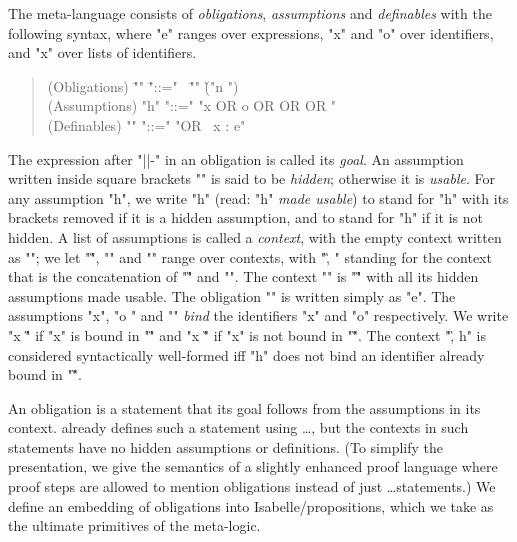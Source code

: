 \documentclass[a4paper]{easychair}
\begin{document}
\begin{defn} \label{defn:syntax}
The \tlatwo meta-language consists of \emph{obligations},
  \emph{assumptions} and \emph{definables} with the following syntax,
  where "e" ranges over \tlatwo expressions, "x" and "o" over \tlatwo
  identifiers, and "\vec x" over lists of \tlatwo identifiers.
\begin{quote}
    \begin{tabbing}
      (Obligations) \SP \= "\phi" \LSP \= "::=" \ \= "" \` ("n ") \\
      (Assumptions) \> "h" \> "::=" \> "\NEW x OR o \DEF \delta OR \phi OR  OR \hide{\phi}" \\
      (Definables) \> "\delta" \> "::=" \> "\phi OR \LAMBDA\ \vec x : e"
    \end{tabbing}
  \end{quote}
The expression after "||-" in an obligation is called its
  \emph{goal}. An assumption written inside square brackets "\hide{\
  }" is said to be \emph{hidden}; otherwise it is \emph{usable}. For
  any assumption "h", we write "\unhide h" (read: "h" \emph{made
    usable}) to stand for "h" with its brackets removed if it is a
  hidden assumption, and to stand for "h" if it is not hidden.
A list of assumptions is called a \emph{context}, with the empty
  context written as "\nil"; we let "\G", "\D" and "\W" range over
  contexts, with "\G, \D" standing for the context that is the
  concatenation of "\G" and "\D". The context "\unhide{\G}" is "\G"
  with all its hidden assumptions made usable.
The obligation "" is written simply as "e". The
  assumptions "\NEW x", "o \DEF \delta" and ""
  \emph{bind} the identifiers "x" and "o" respectively. We write "x
  \in \G" if "x" is bound in "\G" and "x \notin \G" if "x" is not
  bound in "\G". The context "\G, h" is considered syntactically
  well-formed iff "h" does not bind an identifier already bound in
  "\G".
\end{defn}

\noindent An obligation is a statement that its goal follows from the
assumptions in its context. \tlatwo already defines such a statement
using \ASSUME \ldots \PROVE, but the contexts in such statements have
no hidden assumptions or definitions. 
(To simplify the presentation,
we give the semantics of a slightly enhanced proof language
where proof steps are allowed to mention obligations instead of just
\tlatwo \ASSUME \ldots \PROVE statements.) We define an embedding of
obligations into Isabelle/\tlaplus propositions, which we take as the
ultimate primitives of the \tlatwo meta-logic.
\end{document}
